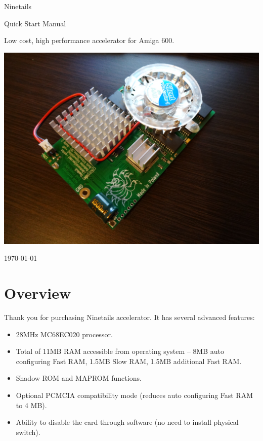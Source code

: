 \documentclass[10pt,a5paper]{article}
\begin{document}
\begin{titlepage}
\begin{center}

\huge
Ninetails

Quick Start Manual

\vspace*{2cm}

\normalsize
Low cost, high performance accelerator for Amiga 600.

\vspace*{2cm}
\includegraphics[scale=0.15]{ninetails-photo.jpg}
\vfill

\normalsize
\today

\end{center}
\end{titlepage}

\section*{Overview}

Thank you for purchasing Ninetails accelerator. It has several advanced features:

\begin{itemize}
	\item 28MHz MC68EC020 processor.
	\item Total of 11MB RAM accessible from operating system -- 8MB auto configuring Fast RAM, 1.5MB Slow RAM, 1.5MB additional Fast RAM.
	\item Shadow ROM and MAPROM functions.
	\item Optional PCMCIA compatibility mode (reduces auto configuring Fast RAM to 4 MB).
	\item Ability to disable the card through software (no need to install physical switch).
\end{itemize}
\end{document}
